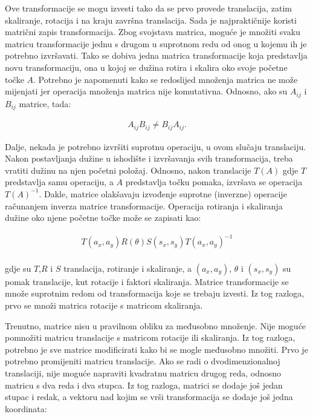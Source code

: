 \documentclass{foi}
\begin{document}
Ove transformacije se mogu izvesti tako da se prvo provede translacija, zatim skaliranje, rotacija i na kraju završna translacija. Sada je najpraktičnije koristi matrični zapis transformacija. Zbog svojstava matrica, moguće je množiti svaku matricu transformacije jednu s drugom u suprotnom redu od onog u kojemu ih je potrebno izvršavati. Tako se dobiva jedna matrica transformacije koja predstavlja novu transformaciju, ona u kojoj se dužina rotira i skalira oko svoje početne točke $A$. Potrebno je napomenuti kako se redoslijed množenja matrica ne može mijenjati jer operacija množenja matrica nije komutativna. Odnosno, ako su $A_{ij}$ i $B_{ij}$ matrice, tada:

\begin{align*}
A_{ij}B_{ij}\neq B_{ij}A_{ij}.
\end{align*}

Dalje, nekada je potrebno izvršiti suprotnu operaciju, u ovom slučaju translaciju. Nakon postavljanja dužine u ishodište i izvršavanja svih transformacija, treba vratiti dužinu na njen početni položaj. Odnosno, nakon translacije $T(A)$ gdje $T$ predstavlja samu operaciju, a $A$ predstavlja točku pomaka, izvršava se operacija $T(A)^{-1}$. Dakle, matrice olakšavaju izvođenje suprotne (inverzne) operacije računanjem inverza matrice transformacije. Operacija rotiranja i skaliranja dužine oko njene početne točke može se zapisati kao:

\begin{align*}
T(a_x,a_y)R(\theta)S(s_x,s_y)T(a_x,a_y)^{-1}
\end{align*}\\
gdje su $T$,$R$ i $S$ translacija, rotiranje i skaliranje, a $(a_x, a_y)$, $\theta$ i $(s_x, s_y)$ su pomak translacije, kut rotacije i faktori skaliranja. Matrice transformacije se množe suprotnim redom od transformacija koje se trebaju izvesti. Iz tog razloga, prvo se množi matrica rotacije s matricom skaliranja. 

Trenutno, matrice nisu u pravilnom obliku za međusobno množenje. Nije moguće pomnožiti matricu translacije s matricom rotacije ili skaliranja. Iz tog razloga, potrebno je sve matrice modificirati kako bi se mogle međusobno množiti. Prvo je potrebno promijeniti matricu translacije. Ako se radi o dvodimenzionalnoj translaciji, nije moguće napraviti kvadratnu matricu drugog reda, odnosno matricu s dva reda i dva stupca. Iz tog razloga, matrici se dodaje još jedan stupac i redak, a vektoru nad kojim se vrši transformacija se dodaje još jedna koordinata:
\end{document}
